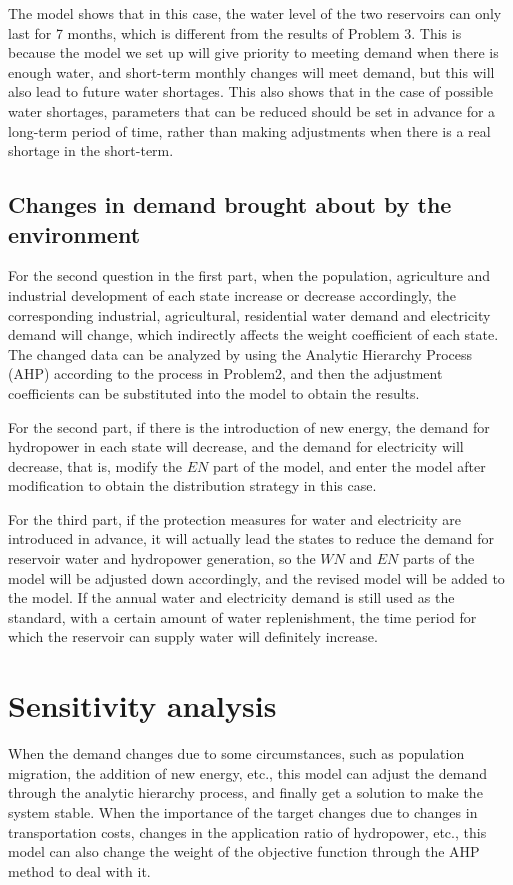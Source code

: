 \documentclass{mcmthesis}
\begin{document}
The model shows that in this case, the water level of the two reservoirs can only last for 7 months, which is different from the results of Problem 3. This is because the model we set up will give priority to meeting demand when there is enough water, and short-term monthly changes will meet demand, but this will also lead to future water shortages. This also shows that in the case of possible water shortages, parameters that can be reduced should be set in advance for a long-term period of time, rather than making adjustments when there is a real shortage in the short-term.
\subsection{Changes in demand brought about by the environment}
For the second question in the first part, when the population, agriculture and industrial development of each state increase or decrease accordingly, the corresponding industrial, agricultural, residential water demand and electricity demand will change, which indirectly affects the weight coefficient of each state. The changed data can be analyzed by using the Analytic Hierarchy Process (AHP) according to the process in Problem2, and then the adjustment coefficients can be substituted into the model to obtain the results.

For the second part, if there is the introduction of new energy, the demand for hydropower in each state will decrease, and the demand for electricity will decrease, that is, modify the $EN$ part of the model, and enter the model after modification to obtain the distribution strategy in this case.

For the third part, if the protection measures for water and electricity are introduced in advance, it will actually lead the states to reduce the demand for reservoir water and hydropower generation, so the $WN$ and $EN$ parts of the model will be adjusted down accordingly, and the revised model will be added to the model. If the annual water and electricity demand is still used as the standard, with a certain amount of water replenishment, the time period for which the reservoir can supply water will definitely increase.
\section{Sensitivity analysis}
When the demand changes due to some circumstances, such as population migration, the addition of new energy, etc., this model can adjust the demand through the analytic hierarchy process, and finally get a solution to make the system stable. When the importance of the target changes due to changes in transportation costs, changes in the application ratio of hydropower, etc., this model can also change the weight of the objective function through the AHP method to deal with it. 
\end{document}
